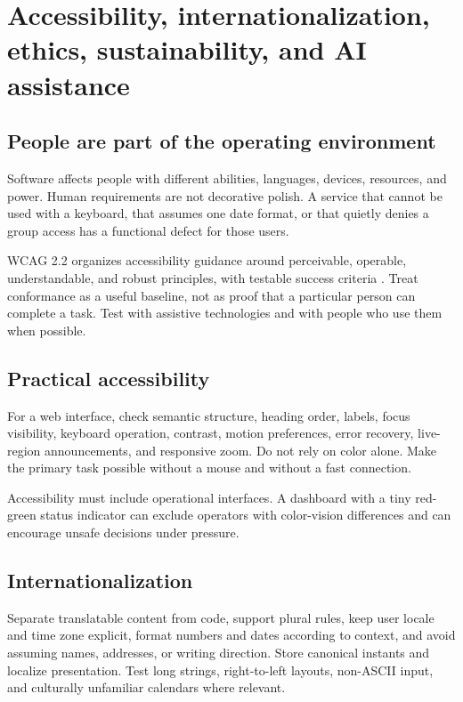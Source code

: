 \chapter{Accessibility, internationalization, ethics, sustainability, and AI assistance}

\section{People are part of the operating environment}
Software affects people with different abilities, languages, devices, resources,
and power. Human requirements are not decorative polish. A service that cannot
be used with a keyboard, that assumes one date format, or that quietly denies a
group access has a functional defect for those users.

WCAG 2.2 organizes accessibility guidance around perceivable, operable,
understandable, and robust principles, with testable success criteria
\cite{w3c2023wcag}. Treat conformance as a useful baseline, not as proof that a
particular person can complete a task. Test with assistive technologies and with
people who use them when possible.

\section{Practical accessibility}
For a web interface, check semantic structure, heading order, labels, focus
visibility, keyboard operation, contrast, motion preferences, error recovery,
live-region announcements, and responsive zoom. Do not rely on color alone. Make
the primary task possible without a mouse and without a fast connection.

Accessibility must include operational interfaces. A dashboard with a tiny red-
green status indicator can exclude operators with color-vision differences and
can encourage unsafe decisions under pressure.

\section{Internationalization}
Separate translatable content from code, support plural rules, keep user locale
and time zone explicit, format numbers and dates according to context, and avoid
assuming names, addresses, or writing direction. Store canonical instants and
localize presentation. Test long strings, right-to-left layouts, non-ASCII input,
and culturally unfamiliar calendars where relevant.

